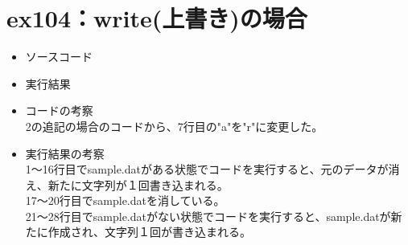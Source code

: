 \documentclass[a4paper]{jsarticle}
\begin{document}
\section{ex104：write(上書き)の場合}
	\begin{itemize}
	\item ソースコード
		 
		\mbox{}\newline
	\item 実行結果
		 
		\mbox{}\newline
	\item コードの考察\mbox{}\\
		2の追記の場合のコードから、7行目の"a"を"r"に変更した。
	\item 実行結果の考察\mbox{}\\
		1〜16行目でsample.datがある状態でコードを実行すると、元のデータが消え、新たに文字列が１回書き込まれる。\\
		17〜20行目でsample.datを消している。\\
		21〜28行目でsample.datがない状態でコードを実行すると、sample.datが新たに作成され、文字列１回が書き込まれる。
	\end{itemize}
	\newpage	%
	
\end{document}
